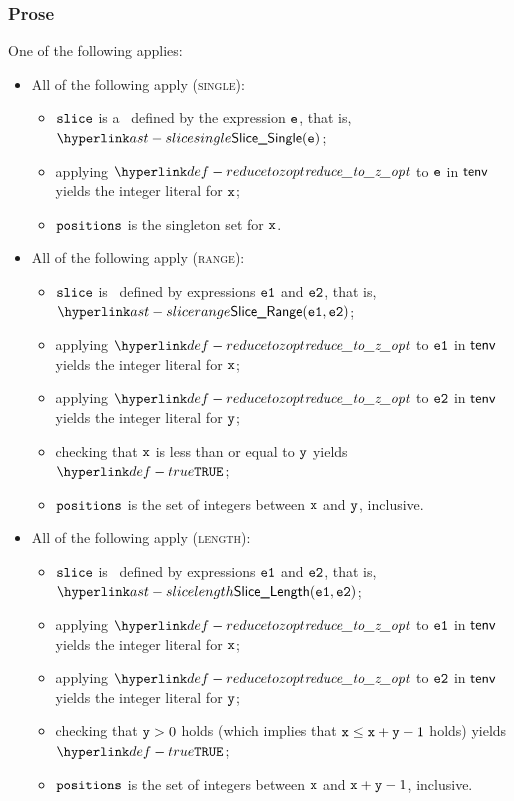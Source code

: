\subsubsection{Prose}
One of the following applies:
\begin{itemize}
  \item All of the following apply (\textsc{single}):
  \begin{itemize}
    \item $\texttt{slice}$ is a \singleslice\ defined by the expression $\texttt{e}$, that is, $\SliceSingle(\ve)$;
    \item applying $\reducetozopt$ to $\texttt{e}$ in $\textsf{tenv}$ yields the integer literal for $\texttt{x}$\ProseTerminateAs{\None};
    \item $\texttt{positions}$ is the singleton set for $\texttt{x}$.
  \end{itemize}

  \item All of the following apply (\textsc{range}):
  \begin{itemize}
    \item $\texttt{slice}$ is \rangeslice\ defined by expressions $\texttt{e1}$ and $\texttt{e2}$, that is, \\
          $\SliceRange(\veone, \vetwo)$;
    \item applying $\reducetozopt$ to $\texttt{e1}$ in $\textsf{tenv}$ yields the integer literal for $\texttt{x}$\ProseTerminateAs{\None};
    \item applying $\reducetozopt$ to $\texttt{e2}$ in $\textsf{tenv}$ yields the integer literal for $\texttt{y}$\ProseTerminateAs{\None};
    \item checking that $\texttt{x}$ is less than or equal to $\texttt{y}$ yields $\True$\ProseTerminateAs{\BitfieldSliceReversed};
    \item $\texttt{positions}$ is the set of integers between $\texttt{x}$ and $\texttt{y}$, inclusive.
  \end{itemize}

  \item All of the following apply (\textsc{length}):
  \begin{itemize}
    \item $\texttt{slice}$ is \lengthslice\ defined by expressions $\texttt{e1}$ and $\texttt{e2}$, that is, \\
          $\SliceLength(\veone, \vetwo)$;
    \item applying $\reducetozopt$ to $\texttt{e1}$ in $\textsf{tenv}$ yields the integer literal for $\texttt{x}$\ProseTerminateAs{\None};
    \item applying $\reducetozopt$ to $\texttt{e2}$ in $\textsf{tenv}$ yields the integer literal for $\texttt{y}$\ProseTerminateAs{\None};
    \item checking that $\texttt{y} > 0$ holds (which implies that $\texttt{x} \leq \texttt{x}+\texttt{y}-1$ holds) yields $\True$\ProseTerminateAs{\BitfieldSliceReversed};
    \item $\texttt{positions}$ is the set of integers between $\texttt{x}$ and $\texttt{x}+\texttt{y}-1$, inclusive.
  \end{itemize}


\end{itemize}
